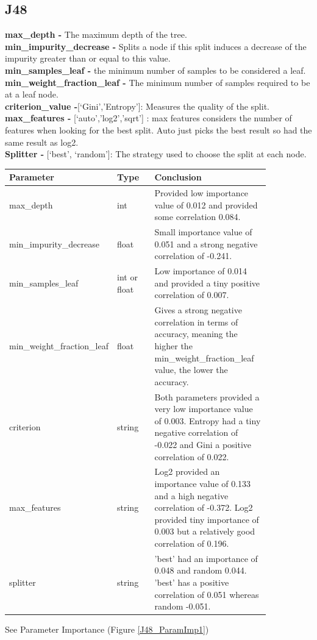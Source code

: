 \documentclass[11pt]{article}
\begin{document}
\newpage
\subsection{J48}
\textbf{max\_depth -} The maximum depth of the tree. \\
\textbf{min\_impurity\_decrease -} Splits a node if this split induces a decrease of the impurity greater than or equal to this value. \\
\textbf{min\_samples\_leaf -} the minimum number of samples to be considered a leaf. \\
\textbf{min\_weight\_fraction\_leaf -} The minimum number of samples required to be at a leaf node. \\
\textbf{criterion\_value -}[‘Gini’,’Entropy’]: Measures the quality of the split.
\textbf{max\_features -} [‘auto’,’log2’,’sqrt’] : max features considers the number of features when looking for the best split. Auto just picks the best result so had the same result as log2. \\
\textbf{Splitter -} [‘best’, ‘random’]: The strategy used to choose the split at each node. 
\newline

\begin{table}[h]
  \centering
  \begin{tabular}{|p{0.25\linewidth} | p{0.15 \linewidth} | p{0.45\linewidth}|} 
    \hline
    \textbf{Parameter}  & \textbf{Type} &\textbf{Conclusion} \\ \hline
    max\_depth & int & Provided low importance value of 0.012 and provided some correlation 0.084. \\ \hline
    min\_impurity\_decrease & float & Small importance value of 0.051 and a strong negative correlation of -0.241.  \\ \hline
    min\_samples\_leaf & int or float & Low importance of 0.014 and provided a tiny positive correlation of 0.007. \\ \hline
    min\_weight\_fraction\_leaf & float & Gives a strong negative correlation in terms of accuracy, meaning the higher the min\_weight\_fraction\_leaf value, the lower the accuracy.\\ \hline
    criterion & string & Both parameters provided a very low importance value of 0.003. Entropy had a tiny negative correlation of -0.022 and Gini a positive correlation of 0.022. \\ \hline
    max\_features & string & Log2 provided an importance value of 0.133 and a high negative correlation of -0.372. Log2 provided tiny importance of 0.003 but a relatively good correlation of 0.196. \\ \hline
    splitter & string & 'best' had an importance of 0.048 and random 0.044. 'best' has a positive correlation of 0.051 whereas random -0.051. \\ \hline
  \end{tabular}
\end{table}\label{RF_Analysis_Table}
See Parameter Importance (Figure \ref{J48_ParamImp1})
\FloatBarrier
\end{document}
